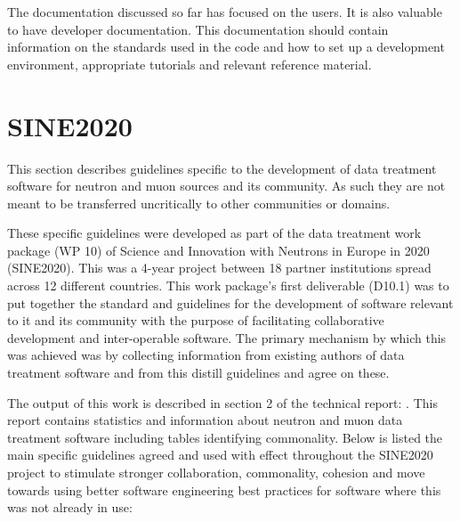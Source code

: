 \documentclass[jnr]{iosart2x}
\begin{document}
\begin{itemzie}
The documentation discussed so far has focused on the users.
It is also valuable to have developer documentation.
This documentation should contain information on the standards used in the code and how to set up a development environment, appropriate tutorials and relevant reference material.

\section{SINE2020}
\label{SINE2020}

This section describes guidelines specific to the development of data treatment software for neutron and muon sources and its community.
As such they are not meant to be transferred uncritically to other communities or domains.

These specific guidelines were developed as part of the data treatment work package (WP 10) of Science and Innovation with Neutrons in Europe in 2020 (SINE2020).
This was a 4-year project between 18 partner institutions spread across 12 different countries.
This work package’s first deliverable (D10.1) was to put together the standard and guidelines for the development of software relevant to it and its community with the purpose of facilitating collaborative development and inter-operable software.
The primary mechanism by which this was achieved was by collecting information from existing authors of data treatment software and from this distill guidelines and agree on these.

The output of this work is described in section 2 of the technical report: \cite{sine2020_wp10_d10_report}.
This report contains statistics and information about neutron and muon data treatment software including tables identifying commonality.
Below is listed the main specific guidelines agreed and used with effect throughout the SINE2020 project to stimulate stronger collaboration,
commonality, cohesion and move towards using better software engineering best practices for software where this was not already in use: 


\end{itemzie}
\end{document}
